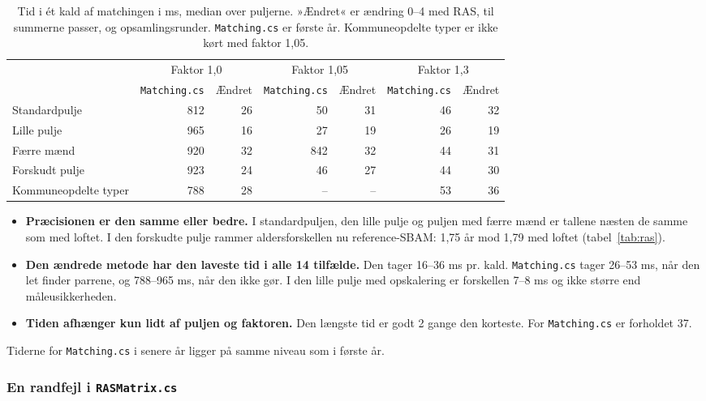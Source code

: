 \documentclass[11pt,a4paper]{article}
\newcommand{\kode}[1]{\texttt{#1}}
\begin{document}
\begin{table}[H]
\centering
\caption{Tid i ét kald af matchingen i ms, median over puljerne. »Ændret« er ændring 0--4 med RAS,
til summerne passer, og opsamlingsrunder. \kode{Matching.cs} er første år. Kommuneopdelte typer er
ikke kørt med faktor 1,05.}
\label{tab:hurtigtid}
\small
\begin{tabular}{@{}lrrrrrr@{}}
\toprule
 & \multicolumn{2}{c}{Faktor 1,0} & \multicolumn{2}{c}{Faktor 1,05} & \multicolumn{2}{c}{Faktor 1,3} \\
\cmidrule(lr){2-3}\cmidrule(lr){4-5}\cmidrule(l){6-7}
 & \kode{Matching.cs} & Ændret & \kode{Matching.cs} & Ændret & \kode{Matching.cs} & Ændret \\
\midrule
Standardpulje & 812 & 26 & 50 & 31 & 46 & 32 \\
Lille pulje & 965 & 16 & 27 & 19 & 26 & 19 \\
Færre mænd & 920 & 32 & 842 & 32 & 44 & 31 \\
Forskudt pulje & 923 & 24 & 46 & 27 & 44 & 30 \\
Kommuneopdelte typer & 788 & 28 & -- & -- & 53 & 36 \\
\bottomrule
\end{tabular}
\end{table}

\begin{itemize}
\item \textbf{Præcisionen er den samme eller bedre.} I standardpuljen, den lille pulje og puljen med
færre mænd er tallene næsten de samme som med loftet. I den forskudte pulje rammer aldersforskellen nu
reference-SBAM: 1,75 år mod 1,79 med loftet (tabel~\ref{tab:ras}).
\item \textbf{Den ændrede metode har den laveste tid i alle 14 tilfælde.} Den tager 16--36 ms pr.
kald. \kode{Matching.cs} tager 26--53 ms, når den let finder parrene, og 788--965 ms, når den ikke
gør. I den lille pulje med opskalering er forskellen 7--8 ms og ikke større end måleusikkerheden.
\item \textbf{Tiden afhænger kun lidt af puljen og faktoren.} Den længste tid er godt 2 gange den
korteste. For \kode{Matching.cs} er forholdet 37.
\end{itemize}

Tiderne for \kode{Matching.cs} i senere år ligger på samme niveau som i første år.

\subsubsection*{En randfejl i \kode{RASMatrix.cs}}
\end{document}
